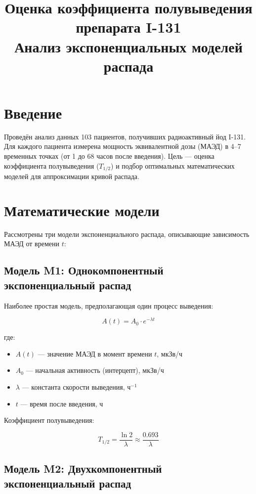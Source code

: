 \documentclass[12pt,a4paper]{article}
\title{Оценка коэффициента полувыведения препарата I-131\\
\large Анализ экспоненциальных моделей распада}
\author{}
\date{}
\begin{document}
\maketitle

\section*{Введение}

Проведён анализ данных 103 пациентов, получивших радиоактивный йод I-131. 
Для каждого пациента измерена мощность эквивалентной дозы (МАЭД) в 4--7 временных точках 
(от 1 до 68 часов после введения). Цель — оценка коэффициента полувыведения ($T_{1/2}$) 
и подбор оптимальных математических моделей для аппроксимации кривой распада.

\section{Математические модели}

Рассмотрены три модели экспоненциального распада, описывающие зависимость МАЭД от времени $t$:

\subsection{Модель M1: Однокомпонентный экспоненциальный распад}

Наиболее простая модель, предполагающая один процесс выведения:

\begin{equation}
A(t) = A_0 \cdot e^{-\lambda t}
\end{equation}

где:
\begin{itemize}
    \item $A(t)$ — значение МАЭД в момент времени $t$, мкЗв/ч
    \item $A_0$ — начальная активность (интерцепт), мкЗв/ч
    \item $\lambda$ — константа скорости выведения, ч$^{-1}$
    \item $t$ — время после введения, ч
\end{itemize}

Коэффициент полувыведения:

\begin{equation}
T_{1/2} = \frac{\ln 2}{\lambda} \approx \frac{0.693}{\lambda}
\end{equation}

\subsection{Модель M2: Двухкомпонентный экспоненциальный распад}
\end{document}
